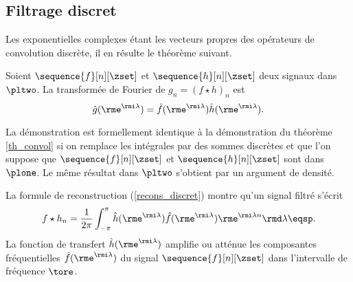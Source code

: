 \subsection{Filtrage discret}
Les exponentielles complexes \'etant les vecteurs propres des
op\'erateurs de convolution discr\`ete, il en r\'esulte
le th\'eor\`eme suivant.

\begin{theorem} 
Soient $\sequence{f}[n][\zset]$ et $\sequence{h}[n][\zset]$ deux signaux dans $\pltwo$.
La transform\'ee de Fourier de $g_n = (f \star h)_n$ est
\begin{equation}
\hat{g}(\rme^{\rmi \lambda}) = \hat{f}(\rme^{\rmi \lambda}) \hat h(\rme^{\rmi \lambda}) .
\end{equation}
\end{theorem}
La d\'emonstration est
formellement identique \`a la d\'emonstration du th\'eor\`eme
\ref{th_convol} si on
remplace les int\'egrales par des sommes discr\`etes
et que l'on suppose que $\sequence{f}[n][\zset]$ et $\sequence{h}[n][\zset]$ sont dans $\plone$.
Le m\^eme r\'esultat dans $\pltwo$ s'obtient par un argument de densit\'e.

La formule de reconstruction (\ref{recons_discret})
montre qu'un signal filtr\'e s'\'ecrit
\begin{equation}
f \star h_n = \frac 1 {2 \pi}
\int_{- \pi}^{\pi} \hat h({\rme^{\rmi \lambda}}) \hat f(\rme^{\rmi \lambda }) \rme ^{\rmi \lambda n} \rmd \lambda \eqsp.
\end{equation}
La fonction de transfert $\hat{h}({\rme^{\rmi \lambda}})$ amplifie ou att\'enue
les composantes fr\'equentielles $\hat f({\rme^{\rmi \lambda}})$ du signal $\sequence{f}[n][\zset]$
dans l'intervalle de fr\'equence $\tore$.

